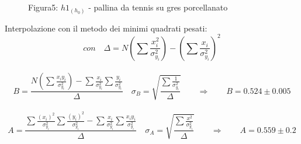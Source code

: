 \documentclass[a4paper]{article}
\theoremstyle{definition}
\begin{document}
	\begin{figure}[!htbp]
		\captionsetup{labelformat=empty}
	\caption{Figura5: \(h1_{(h_{0})}\) - pallina da tennis su gres porcellanato}
	\end{figure}

	\noindent Interpolazione con il metodo dei minimi quadrati pesati:\\
	\[ con\quad\Delta = N(\sum \frac{x_{i}^{2}}{\sigma _{y_{i}}^{2}})-(\sum \frac{x_{i}}{\sigma _{y_{i}}^{2}})^{2}\]\\
	\[B = \frac{N(\sum\frac{x_{i}y_{i}}{\sigma _{y_{i}}^{2}})-\sum\frac{x_{i}}{\sigma _{y_{i}}^{2}}\sum\frac{y_{i}}{\sigma _{y_{i}}^{2}}}{\Delta } \quad
	\sigma _{B} = \sqrt{\frac{\sum \frac{1}{\sigma _{y_{i}}^{2}}}{\Delta}} \qquad
	\Rightarrow \qquad B = 0.524 \pm 0.005\]\\
	\[A = \frac{\sum \frac{(x_{i})^{2}}{\sigma _{y_{i}}^{2}}\sum \frac{(y_{i})^{2}}{\sigma _{y_{i}}^{2}}-\sum \frac{x_{i}}{\sigma _{y_{i}}^{2}}\sum \frac{x_{i}y_{i}}{\sigma _{y_{i}}^{2}}}{\Delta} \quad  \sigma _{A} = \sqrt{\frac{\sum \frac{x^{2}}{\sigma _{y_{i}}^{2}}}{\Delta}} \qquad \Rightarrow \qquad A = 0.559 \pm 0.2\]\\\\\\\\
	
\end{document}
